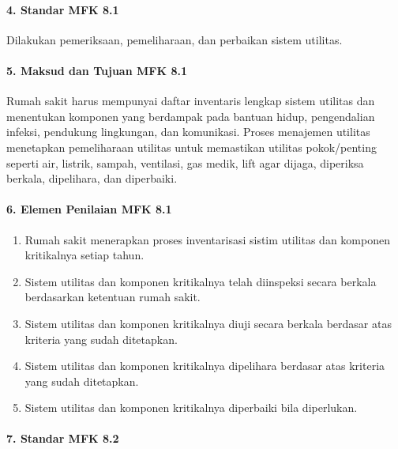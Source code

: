 \documentclass[
]{book}
\providecommand{\tightlist}{%
  \setlength{\itemsep}{0pt}\setlength{\parskip}{0pt}}
\begin{document}
\hypertarget{standar-mfk-8.1}{%
\paragraph*{4. Standar MFK 8.1}\label{standar-mfk-8.1}}

Dilakukan pemeriksaan, pemeliharaan, dan perbaikan sistem utilitas.

\hypertarget{maksud-dan-tujuan-mfk-8.1}{%
\paragraph*{5. Maksud dan Tujuan MFK 8.1}\label{maksud-dan-tujuan-mfk-8.1}}

Rumah sakit harus mempunyai daftar inventaris lengkap sistem utilitas dan menentukan komponen yang berdampak pada bantuan hidup, pengendalian infeksi, pendukung lingkungan, dan komunikasi. Proses menajemen utilitas menetapkan pemeliharaan utilitas untuk memastikan utilitas pokok/penting seperti air, listrik, sampah, ventilasi, gas medik, lift agar dijaga, diperiksa berkala, dipelihara, dan diperbaiki.

\hypertarget{elemen-penilaian-mfk-8.1}{%
\paragraph*{6. Elemen Penilaian MFK 8.1}\label{elemen-penilaian-mfk-8.1}}

\begin{enumerate}
\def\labelenumi{\alph{enumi}.}
\tightlist
\item
  Rumah sakit menerapkan proses inventarisasi sistim utilitas dan komponen kritikalnya setiap tahun.
\item
  Sistem utilitas dan komponen kritikalnya telah diinspeksi secara berkala berdasarkan ketentuan rumah sakit.
\item
  Sistem utilitas dan komponen kritikalnya diuji secara berkala berdasar atas kriteria yang sudah ditetapkan.
\item
  Sistem utilitas dan komponen kritikalnya dipelihara berdasar atas kriteria yang sudah ditetapkan.
\item
  Sistem utilitas dan komponen kritikalnya diperbaiki bila diperlukan.
\end{enumerate}

\hypertarget{standar-mfk-8.2}{%
\paragraph*{7. Standar MFK 8.2}\label{standar-mfk-8.2}}
\end{document}
